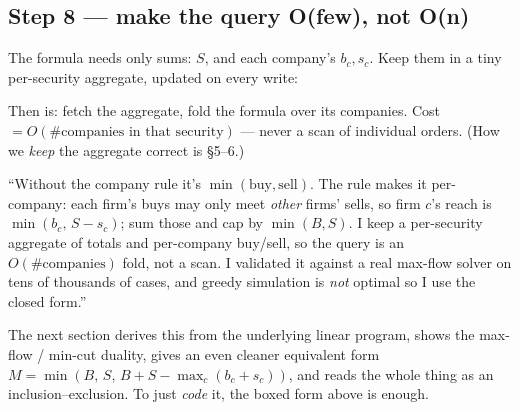 \subsection{Step 8 --- make the query O(few), not O(n)}

The formula needs only sums: $S$, and each company's $b_c,s_c$. Keep them in a
tiny per-security aggregate, updated on every write:

\begin{center}
\end{center}

Then  is: fetch the aggregate, fold the formula
over its companies. Cost $=O(\#\text{companies in that security})$ --- never a scan
of individual orders. (How we \emph{keep} the aggregate correct is \S5--6.)

\begin{say}
``Without the company rule it's $\min(\text{buy},\text{sell})$. The rule makes it
per-company: each firm's buys may only meet \emph{other} firms' sells, so firm
$c$'s reach is $\min(b_c,\,S-s_c)$; sum those and cap by $\min(B,S)$. I keep a
per-security aggregate of totals and per-company buy/sell, so the query is an
$O(\#\text{companies})$ fold, not a scan. I validated it against a real max-flow
solver on tens of thousands of cases, and greedy simulation is \emph{not} optimal
so I use the closed form.''
\end{say}

\begin{keybox}
The next section derives this from the underlying linear program, shows the
max-flow / min-cut duality, gives an even cleaner equivalent form
$M=\min(B,\,S,\,B+S-\max_c(b_c+s_c))$, and reads the whole thing as an
inclusion--exclusion. To just \emph{code} it, the boxed form above is enough.
\end{keybox}
